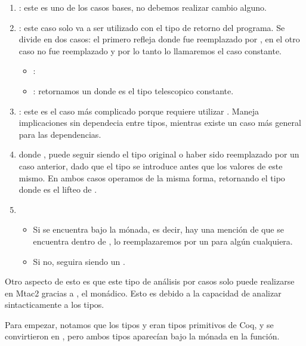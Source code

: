 \begin{enumerate}
\item {}: este es uno de los casos bases, no debemos realizar
  cambio alguno.
\item {}: este caso solo va a ser utilizado con el tipo de
  retorno del programa. Se divide en dos casos: el primero refleja 
  donde  fue reemplazado por , en el otro caso  no
  fue reemplazado y por lo tanto lo llamaremos el caso constante.
  \begin{itemize}
  \item {}: 
  \item {}: retornamos un  donde  es
    el tipo telescopico constante.
  \end{itemize}
\item {}: este es el caso más complicado porque requiere utilizar
  . Maneja implicaciones sin dependecia entre tipos, mientras
  existe un caso más general para las dependencias.
\item {} donde ,  puede seguir siendo el
  tipo original o haber sido reemplazado por un caso anterior, dado que el tipo
  se introduce antes que los valores de este mismo. En ambos casos operamos de
  la misma forma, retornando el tipo  donde 
  es el lifteo de .
\item {}
  \begin{itemize}
  \item Si  se encuentra bajo la mónada, es decir, hay una mención de
     que se encuentra dentro de , lo reemplazaremos por un
     para algún  cualquiera.
  \item Si no,  seguira siendo un .
  \end{itemize}
\end{enumerate}

Otro aspecto de esto es que este tipo de análisis por casos solo puede
realizarse en Mtac2 gracias a , el  monádico. Esto es
debido a la capacidad de analizar sintacticamente a los tipos.

Para empezar, notamos que los tipos  y  eran tipos primitivos de
Coq, y se convirtieron en , pero ambos tipos aparecían bajo la
mónada en la función.